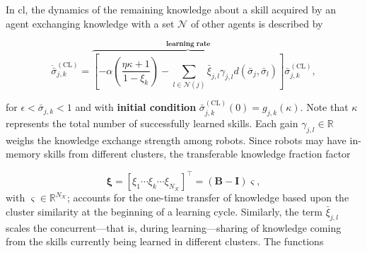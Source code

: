 \documentclass[12pt]{article}
\begin{document}
In \ac{cl}, the dynamics of the remaining knowledge  about a skill acquired by an agent exchanging knowledge with a set $\mathcal{N}$ of other agents is described by

\begin{equation}\label{eq:collective_knowledge_dynamics}
	\dot{\bar{\sigma}}^{(\text{CL})}_{j,k} =
		\overbrace{\left[-\alpha \left( \frac{\eta \kappa + 1}{1 - \xi_k} \right)  - \sum\limits_{l \in \mathcal{N}(j)} \bar{\xi}_{j,l} \gamma_{j,l} d(\bar{\sigma}_j,\bar{\sigma}_l)\right]}^{\textbf{learning rate}} \bar{\sigma}^{(\text{CL})}_{j,k},
\end{equation}

\noindent for $\epsilon < \bar{\sigma}_{j,k} < 1$ and with \textbf{initial condition} $\bar{\sigma}^{(\text{CL})}_{j,k}(0) = g_{j,k}\left(\kappa\right)$. Note that $\kappa$ represents the total number of successfully learned skills. Each gain $\gamma_{j,l} \in \mathbb{R} $ weighs the knowledge exchange strength among robots. Since robots may have in-memory skills from different clusters, the transferable knowledge fraction factor

\begin{equation} 
	\bm{\xi} = [\xi_1 \cdots \xi_k \cdots \xi_{N_\mathcal{K}}]^\intercal = (\bm{B} - \bm{I}) \bm{\varsigma} ,
\end{equation}
with $\bm{\varsigma} \in \mathbb{R}^{N_\mathcal{K}}$; accounts for the one-time transfer of knowledge based upon the cluster similarity at the beginning of a learning cycle. Similarly, the term $ \bar{\xi}_{j,l} $ scales the concurrent---that is, during learning---sharing of knowledge coming from the skills currently being learned in different clusters. The functions
\end{document}
